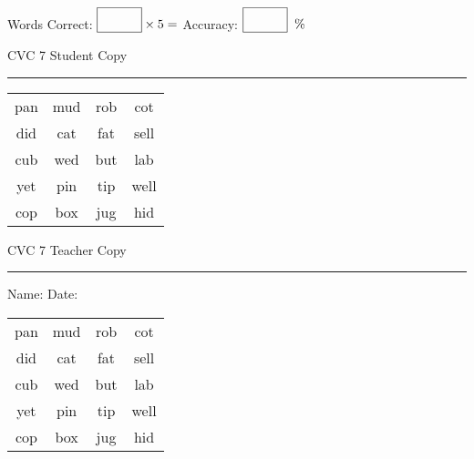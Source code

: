 \documentclass{memoir}
\begin{document}
\small

Words Correct: $\fbox{\phantom{\huge 100}} \times 5 = $ Accuracy: $\fbox{\phantom{\huge 100}}\;\; \%$ 

\vfill

\newpage


\footnotesize \noindent
CVC 7 \hfill Student Copy
\smallskip
\hrule

\Large

\setlength{\tabcolsep}{14pt}
\def\arraystretch{2}

{\selectfont


\begin{vplace}[0.5]
\begin{center}
\begin{tabular}{cccc}
pan & mud & rob & cot \\
did & cat & fat & sell \\
cub & wed & but & lab \\
yet & pin & tip & well \\
cop & box & jug & hid \\
\end{tabular}
\end{center}
\end{vplace}

}

\newpage

\footnotesize \noindent
CVC 7 \hfill Teacher Copy
\smallskip
\hrule

\small

\vfill

\noindent
Name: \underline{\hspace{1.75in}} \hfill Date: \underline{\hspace{1in}}

\Large

{\selectfont


\begin{vplace}[0.5]
\begin{center}
\begin{tabular}{cccc}
pan & mud & rob & cot \\
did & cat & fat & sell \\
cub & wed & but & lab \\
yet & pin & tip & well \\
cop & box & jug & hid \\
\end{tabular}
\end{center}
\end{vplace}



}
\end{document}
